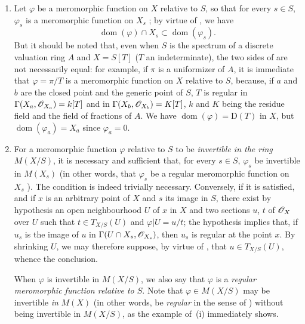 \begin{remarks}[20.6.5]\label{IV.20.6.5}
\begin{enumerate}[label=(\roman*)]
  \item Let $\varphi$ be a meromorphic function on $X$ relative to $S$, so that for every $s\in S$, $\varphi_s$ is a meromorphic function on $X_s$ ; by virtue of , we have
  \[
  \label{IV.20.6.5.1}
    \operatorname{dom}(\varphi)\cap X_s\subset\operatorname{dom}(\varphi_s).
    \tag{20.6.5.1}
  \]
  But it should be noted that, even when $S$ is the spectrum of a discrete valuation ring $A$ and $X=S[T]$ ($T$ an indeterminate), the two sides of  are not necessarily equal: for example, if $\pi$ is a uniformizer of $A$, it is immediate that $\varphi=\pi/T$ is a meromorphic function on $X$ relative to $S$, because, if $a$ and $b$ are the closed point and the generic point of $S$, $T$ is regular in $\Gamma(X_a,\mathscr{O}_{X_a})=k[T]$ and in $\Gamma(X_b,\mathscr{O}_{X_b})=K[T]$, $k$ and $K$ being the residue field and the field of fractions of $A$.
  We have $\operatorname{dom}(\varphi)=\mathrm{D}(T)$ in $X$, but $\operatorname{dom}(\varphi_a)=X_a$ since $\varphi_a=0$.

  \item For a meromorphic function $\varphi$ relative to $S$ to be \emph{invertible in the ring} $M(X/S)$, it is necessary and sufficient that, for every $s\in S$, $\varphi_s$ be invertible in $M(X_s)$ (in other words, that $\varphi_s$ be a regular meromorphic function on $X_s$ ).
  The condition is
  indeed trivially necessary.
  Conversely, if it is satisfied, and if $x$ is an arbitrary point of $X$ and $s$ its image in $S$, there exist by hypothesis an open neighbourhood $U$ of $x$ in $X$ and two sections $u$, $t$ of $\mathscr{O}_X$ over $U$ such that $t\in T_{X/S}(U)$ and $\varphi|U=u/t$; the hypothesis implies that, if $u_s$ is the image of $u$ in $\Gamma(U\cap X_s,\mathscr{O}_{X_s})$, then $u_s$ is regular at the point $x$.
  By shrinking $U$, we may therefore suppose, by virtue of , that $u\in T_{X/S}(U)$, whence the conclusion.

  When $\varphi$ is invertible in $M(X/S)$, we also say that $\varphi$ is a \emph{regular meromorphic function relative to $S$}.
  Note that $\varphi\in M(X/S)$ may be invertible \emph{in} $M(X)$ (in other words, be \emph{regular} in the sense of ) without being invertible in $M(X/S)$, as the example of~(i) immediately shows.


\end{enumerate}
\end{remarks}
